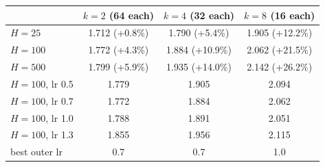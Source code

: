 \begin{tabular}{lccc}
\toprule
 & $k = 2$ (64 each) & $k = 4$ (32 each) & $k = 8$ (16 each) \\
\midrule
$H = 25$ & 1.712 (+0.8\%) & 1.790 (+5.4\%) & 1.905 (+12.2\%) \\
$H = 100$ & 1.772 (+4.3\%) & 1.884 (+10.9\%) & 2.062 (+21.5\%) \\
$H = 500$ & 1.799 (+5.9\%) & 1.935 (+14.0\%) & 2.142 (+26.2\%) \\
\midrule
$H = 100$, lr 0.5 & 1.779 & 1.905 & 2.094 \\
$H = 100$, lr 0.7 & 1.772 & 1.884 & 2.062 \\
$H = 100$, lr 1.0 & 1.788 & 1.891 & 2.051 \\
$H = 100$, lr 1.3 & 1.855 & 1.956 & 2.115 \\
best outer lr & 0.7 & 0.7 & 1.0 \\
\bottomrule
\end{tabular}
